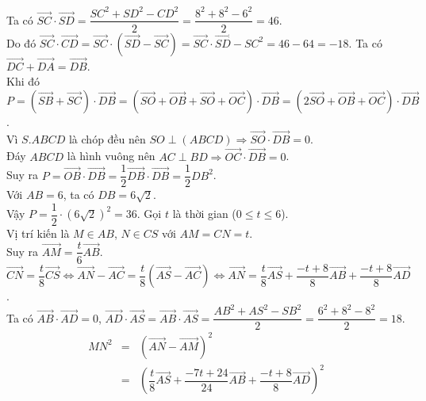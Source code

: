 \begin{ex}
{\begin{itemchoice}
			\itemch Ta có $\overrightarrow{SC} \cdot \overrightarrow{SD}=\dfrac{SC^2+SD^2-CD^2}{2}=\dfrac{8^2+8^2-6^2}{2}=46$.\\
			Do đó $\overrightarrow{SC} \cdot \overrightarrow{CD}=\overrightarrow{SC}\cdot\left(\overrightarrow{SD}-\overrightarrow{SC}\right) = \overrightarrow{SC} \cdot \overrightarrow{SD} - SC^2 = 46 - 64 = -18$.
			\itemch Ta có $\overrightarrow{DC} + \overrightarrow{DA} = \overrightarrow{DB}$.\\
			Khi đó $P = \left(\overrightarrow{SB} + \overrightarrow{SC}\right) \cdot \overrightarrow{DB} = \left(\overrightarrow{SO} + \overrightarrow{OB} + \overrightarrow{SO} + \overrightarrow{OC}\right) \cdot \overrightarrow{DB} = \left(2\overrightarrow{SO} + \overrightarrow{OB} + \overrightarrow{OC}\right) \cdot \overrightarrow{DB}$.\\
			Vì $S.ABCD$ là chóp đều nên $SO \perp (ABCD) \Rightarrow \overrightarrow{SO} \cdot \overrightarrow{DB} = 0$.\\
			Đáy $ABCD$ là hình vuông nên $AC \perp BD \Rightarrow \overrightarrow{OC} \cdot \overrightarrow{DB} = 0$.\\
			Suy ra $P = \overrightarrow{OB} \cdot \overrightarrow{DB} = \dfrac{1}{2}\overrightarrow{DB} \cdot \overrightarrow{DB} = \dfrac{1}{2}DB^2$.\\
			Với $AB=6$, ta có $DB = 6\sqrt{2}$.\\ Vậy $P = \dfrac{1}{2} \cdot \left(6\sqrt{2}\right)^2 = 36$.
			\itemch Gọi $t$ là thời gian ($0 \leq t \leq 6$).\\ Vị trí kiến là $M \in AB$, $N \in CS$ với $AM=CN=t$. \\
			Suy ra $\overrightarrow{AM}=\dfrac{t}{6}\overrightarrow{AB}$.\\ $\overrightarrow{CN}=\dfrac{t}{8}\overrightarrow{CS}\Leftrightarrow \overrightarrow{AN}-\overrightarrow{AC}
			=\dfrac{t}{8}\left(\overrightarrow{AS}-\overrightarrow{AC}\right)\Leftrightarrow \overrightarrow{AN} =\dfrac{t}{8}\overrightarrow{AS}+\dfrac{-t+8}{8}\overrightarrow{AB} +\dfrac{-t+8}{8}\overrightarrow{AD}$.\\
			Ta có $\overrightarrow{AB}\cdot \overrightarrow{AD}=0$, $\overrightarrow{AD}\cdot \overrightarrow{AS}= \overrightarrow{AB}\cdot \overrightarrow{AS}= \dfrac{AB^2+AS^2-SB^2}{2}=\dfrac{6^2+8^2-8^2}{2}=18$.
			\begin{eqnarray*}
				MN^2&=&\left(\overrightarrow{AN}-\overrightarrow{AM}\right)^2\\
				&=&\left(\dfrac{t}{8}\overrightarrow{AS}+\dfrac{-7t+24}{24}\overrightarrow{AB} +\dfrac{-t+8}{8}\overrightarrow{AD}\right)^2\\

\end{eqnarray*}
\end{itemchoice}}
\end{ex}
